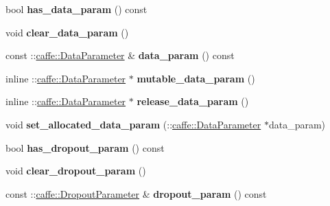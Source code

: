 \begin{DoxyCompactItemize}
bool {\bfseries has\+\_\+data\+\_\+param} () const
\item 
\mbox{\label{classcaffe_1_1_v1_layer_parameter_a8ee663211d7923e69feef156c2712aa1}} 
void {\bfseries clear\+\_\+data\+\_\+param} ()
\item 
\mbox{\label{classcaffe_1_1_v1_layer_parameter_a740f3a54957f079b41c6073c9d933c94}} 
const \+::\mbox{\hyperlink{classcaffe_1_1_data_parameter}{caffe\+::\+Data\+Parameter}} \& {\bfseries data\+\_\+param} () const
\item 
\mbox{\label{classcaffe_1_1_v1_layer_parameter_a5d3028ef9682e9686b05deec03852a5b}} 
inline \+::\mbox{\hyperlink{classcaffe_1_1_data_parameter}{caffe\+::\+Data\+Parameter}} $\ast$ {\bfseries mutable\+\_\+data\+\_\+param} ()
\item 
\mbox{\label{classcaffe_1_1_v1_layer_parameter_ad0e0a297fe0eab28e57391e627cf41e4}} 
inline \+::\mbox{\hyperlink{classcaffe_1_1_data_parameter}{caffe\+::\+Data\+Parameter}} $\ast$ {\bfseries release\+\_\+data\+\_\+param} ()
\item 
\mbox{\label{classcaffe_1_1_v1_layer_parameter_a29e4348178e803babbb55ef1d9cc3bcf}} 
void {\bfseries set\+\_\+allocated\+\_\+data\+\_\+param} (\+::\mbox{\hyperlink{classcaffe_1_1_data_parameter}{caffe\+::\+Data\+Parameter}} $\ast$data\+\_\+param)
\item 
\mbox{\label{classcaffe_1_1_v1_layer_parameter_a9619bff45d433930260ed5c853be23f5}} 
bool {\bfseries has\+\_\+dropout\+\_\+param} () const
\item 
\mbox{\label{classcaffe_1_1_v1_layer_parameter_a57b17face87cb87b1d687d908ca0bdb4}} 
void {\bfseries clear\+\_\+dropout\+\_\+param} ()
\item 
\mbox{\label{classcaffe_1_1_v1_layer_parameter_a7939db963999096f3a83a346d929d4c8}} 
const \+::\mbox{\hyperlink{classcaffe_1_1_dropout_parameter}{caffe\+::\+Dropout\+Parameter}} \& {\bfseries dropout\+\_\+param} () const

\end{DoxyCompactItemize}
